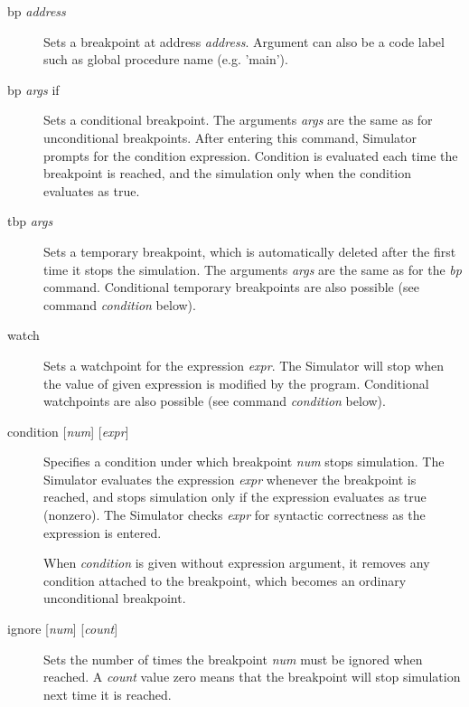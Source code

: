 \documentclass[twoside]{tceusermanual}
\begin{document}
\begin{description}
\item[bp \emph{address}] %
  Sets a breakpoint at address \emph{address}. Argument can also be a code
  label such as global procedure name (e.g. 'main').
\item[bp \emph{args} if] %
  Sets a conditional breakpoint.  The arguments \emph{args} are the same as
  for unconditional breakpoints.  After entering this command, Simulator
  prompts for the condition expression. Condition is evaluated each time 
  the breakpoint is reached, and the simulation only when the condition 
  evaluates as true.
\item[tbp \emph{args}] %
  Sets a temporary breakpoint, which is automatically deleted after the
  first time it stops the simulation.  The arguments \emph{args} are the
  same as for the \emph{bp} command.  Conditional temporary breakpoints
  are also possible (see command \emph{condition} below).
\item[watch] %
  Sets a watchpoint for the expression \emph{expr}.  The Simulator will stop
  when the value of given expression is modified by the program.
  Conditional watchpoints are also possible (see command \emph{condition}
  below). 
\item[condition {[\emph{num}] [\emph{expr}]}] %
  Specifies a condition under which breakpoint \emph{num} stops simulation.
  The Simulator evaluates the expression \emph{expr} whenever the breakpoint
  is reached, and stops simulation only if the expression evaluates as true
  (nonzero).  The Simulator checks \emph{expr} for syntactic correctness as
  the expression is entered.

  When \emph{condition} is given without expression argument, it removes any
  condition attached to the breakpoint, which becomes an ordinary
  unconditional breakpoint.
\item[ignore {[\emph{num}] [\emph{count}]}] %
  Sets the number of times the breakpoint \emph{num} must be ignored when
  reached.  A \emph{count} value zero means that the breakpoint will stop
  simulation next time it is reached.


\end{description}
\end{document}

